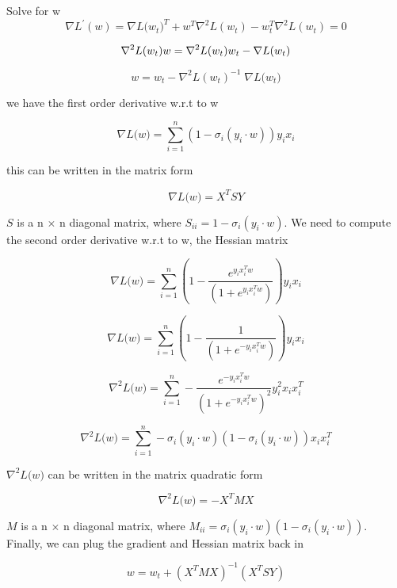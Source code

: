 \documentclass[11pt]{report}
\begin{document}
\justify Solve for w
\[
\nabla{L^{'}(w)} =  \nabla{L(w_{t}})^{T} + w^{T} \nabla^{2}{L(w_{t})} - w_{t}^{T} \nabla^{2}{L(w_{t})} = 0
\]

\[
\nabla^{2}{L(w_{t})}  w =   \nabla^{2}{L(w_{t})} w_{t} - \nabla{L(w_{t}})  \\
\]

\[
w=  w_{t} - \nabla^{2}{L(w_{t})}^{-1} \; \nabla{L(w_{t}}) 
\]

\-

\justify we have the first order derivative w.r.t to w 

\-

\[
\nabla{L(w}) = \sum_{i=1}^{n} (1 - \sigma_{i}(y_{i} \cdot w)) y_{i} x_{i}
\]

\-

\justify this can be written in the matrix form

\-

\[
\nabla{L(w}) = X^{T}SY
\]

\-

\justify $S$ is a n $\times$ n diagonal matrix, where $S_{ii} = 1 - \sigma_{i} ({y_{i} \cdot w})$. We need to compute the second order derivative w.r.t to w, the Hessian matrix

\-

\[
\nabla{L(w}) = \sum_{i=1}^{n} (1 - \frac{e^{y_{i} x_{i}^{T} w}} {(1 + e^{y_{i} x_{i}^{T} w})} ) y_{i} x_{i}
\]

\[
\nabla{L(w}) = \sum_{i=1}^{n} ( 1 - \frac{1} {(1 + e^{-y_{i} x_{i}^{T} w})} ) y_{i} x_{i}
\]

\[
\nabla^{2}{L(w}) = \sum_{i=1}^{n} - \frac{ e^{-y_{i} x_{i}^{T} w } } {(1 + e^{-y_{i} x_{i}^{T} w})^{2}}  y_{i}^{2} x_{i} x_{i}^{T}
\]

\[
\nabla^{2}{L(w}) = \sum_{i=1}^{n} - \sigma_{i} ({y_{i} \cdot w})( 1 - \sigma_{i} ({y_{i} \cdot w})) x_{i} x_{i}^{T}
\]

\-

\justify $\nabla^{2}{L(w})$ can be written in the matrix quadratic form 

\-


\[
\nabla^{2}{L(w}) = - X^{T} M X
\]

\-

\justify $M$ is a n $\times$ n diagonal matrix, where $M_{ii} = \sigma_{i} ({y_{i} \cdot w})( 1 - \sigma_{i} ({y_{i} \cdot w}))$. Finally, we can plug the gradient and Hessian matrix back in

\-

\[
w =  w_{t} + (X^{T} M X)^{-1} (X^{T}SY)
\]
\end{document}
